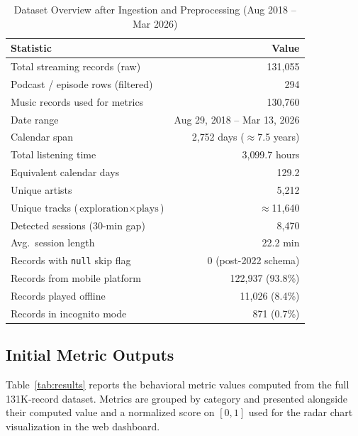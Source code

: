 \documentclass[conference]{IEEEtran}
\begin{document}
\begin{table}[ht]
\centering
\caption{Dataset Overview after Ingestion and Preprocessing (Aug 2018 -- Mar 2026)}
\label{tab:overview}
\renewcommand{\arraystretch}{1.2}
\begin{tabular}{p{4.6cm} r}
\toprule
\textbf{Statistic} & \textbf{Value} \\
\midrule
Total streaming records (raw)        & 131{,}055 \\
Podcast / episode rows (filtered)    & 294 \\
Music records used for metrics       & 130{,}760 \\
Date range                           & Aug 29, 2018 -- Mar 13, 2026 \\
Calendar span                        & 2{,}752 days ($\approx$7.5 years) \\
Total listening time                 & 3{,}099.7 hours \\
Equivalent calendar days             & 129.2 \\
Unique artists                       & 5{,}212 \\
Unique tracks (\(\text{exploration}\!\times\!\text{plays}\)) & $\approx$11{,}640 \\
Detected sessions (30-min gap)       & 8{,}470 \\
Avg.\ session length                 & 22.2 min \\
Records with \texttt{null} skip flag & 0 (post-2022 schema) \\
Records from mobile platform         & 122{,}937 (93.8\%) \\
Records played offline               & 11{,}026 (8.4\%) \\
Records in incognito mode            & 871 (0.7\%) \\
\bottomrule
\end{tabular}
\end{table}

\subsection{Initial Metric Outputs}

Table~\ref{tab:results} reports the behavioral metric values computed from the full 131K-record dataset. Metrics are grouped by category and presented alongside their computed value and a normalized score on $[0,1]$ used for the radar chart visualization in the web dashboard.
\end{document}
